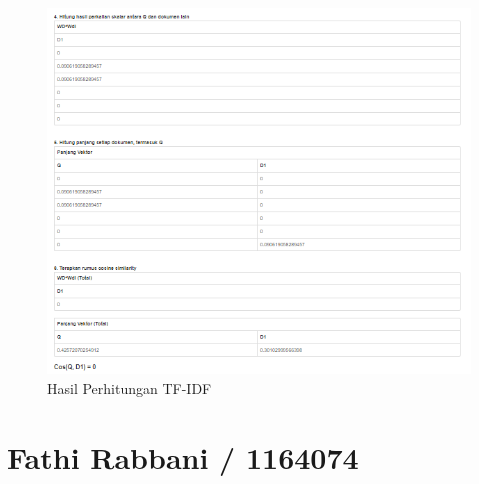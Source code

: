 \begin{figure}
      \centerline{\includegraphics[width=1\textwidth]
      {figures/cokro/c61}}
      \caption{Hasil Perhitungan  TF-IDF}
      \label{c61}
      \end{figure}

\section{Fathi Rabbani / 1164074}
